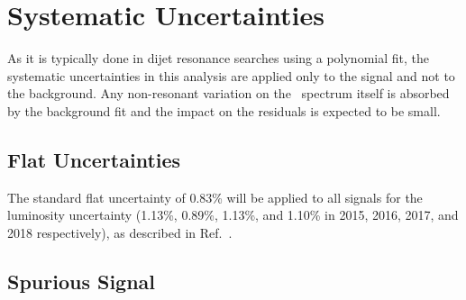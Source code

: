 \section{Systematic Uncertainties}
\label{sec:syst}


%
%
%
%



As it is typically done in dijet resonance searches using a polynomial fit, the systematic uncertainties in this analysis are applied only to the signal and not to the background. 
Any non-resonant variation on the \mt~spectrum itself is absorbed by the background fit and the impact on the residuals is expected to be small.


\subsection{Flat Uncertainties}
The standard flat uncertainty of 0.83\% will be applied to all signals for the luminosity uncertainty (1.13\%, 0.89\%, 1.13\%, and 1.10\% in 2015, 2016, 2017, and 2018 respectively), as described in Ref.~\cite{ATLAS-CONF-2019-021}.

\subsection{Spurious Signal}

